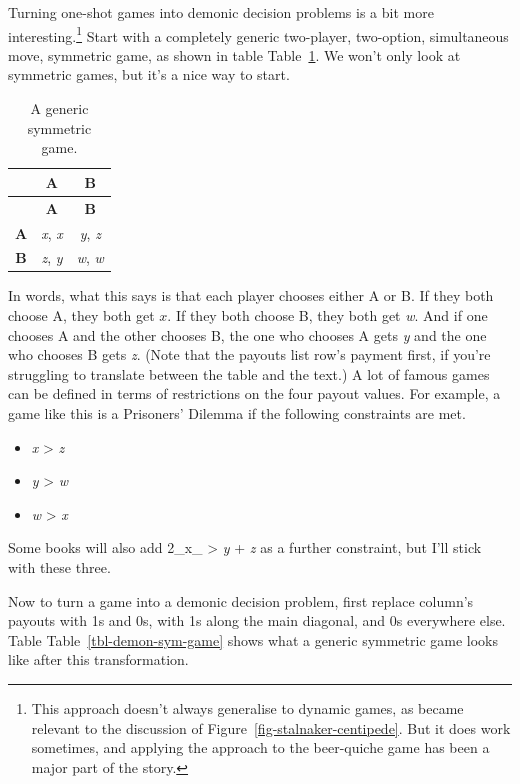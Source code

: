 \documentclass[
  12pt,
  letterpaper,
  DIV=11,
  numbers=noendperiod]{scrreprt}
\providecommand{\tightlist}{%
  \setlength{\itemsep}{0pt}\setlength{\parskip}{0pt}}\usepackage{longtable,booktabs,array}
\begin{document}
Turning one-shot games into demonic decision problems is a bit more
interesting.\footnote{This approach doesn't always generalise to dynamic
  games, as became relevant to the discussion of
  Figure~\ref{fig-stalnaker-centipede}. But it does work sometimes, and
  applying the approach to the beer-quiche game has been a major part of
  the story.} Start with a completely generic two-player, two-option,
simultaneous move, symmetric game, as shown in table
Table~\ref{tbl-basic-sym-game}. We won't only look at symmetric games,
but it's a nice way to start.

\hypertarget{tbl-basic-sym-game}{}
\begin{longtable}[]{@{}ccc@{}}
\caption{\label{tbl-basic-sym-game}A generic symmetric
game.}\tabularnewline
\toprule\noalign{}
& \textbf{A} & \textbf{B} \\
\midrule\noalign{}
\endfirsthead
\toprule\noalign{}
& \textbf{A} & \textbf{B} \\
\midrule\noalign{}
\endhead
\bottomrule\noalign{}
\endlastfoot
\textbf{A} & \emph{x}, \emph{x} & \emph{y}, \emph{z} \\
\textbf{B} & \emph{z}, \emph{y} & \emph{w}, \emph{w} \\
\end{longtable}

In words, what this says is that each player chooses either A or B. If
they both choose A, they both get \(x\). If they both choose B, they
both get \emph{w}. And if one chooses A and the other chooses B, the one
who chooses A gets \emph{y} and the one who chooses B gets \emph{z}.
(Note that the payouts list row's payment first, if you're struggling to
translate between the table and the text.) A lot of famous games can be
defined in terms of restrictions on the four payout values. For example,
a game like this is a Prisoners' Dilemma if the following constraints
are met.

\begin{itemize}
\tightlist
\item
  \emph{x} \textgreater{} \emph{z}
\item
  \emph{y} \textgreater{} \emph{w}
\item
  \emph{w} \textgreater{} \emph{x}
\end{itemize}

Some books will also add 2\_x\_ \textgreater{} \emph{y} + \emph{z} as a
further constraint, but I'll stick with these three.

Now to turn a game into a demonic decision problem, first replace
column's payouts with 1s and 0s, with 1s along the main diagonal, and 0s
everywhere else. Table Table~\ref{tbl-demon-sym-game} shows what a
generic symmetric game looks like after this transformation.
\end{document}
